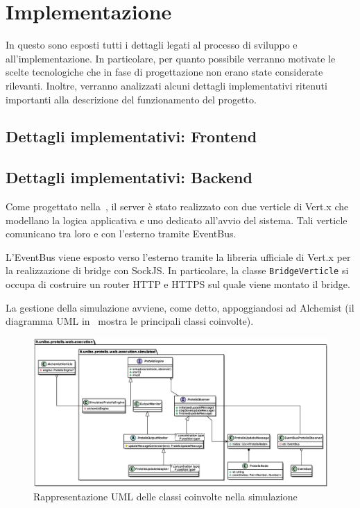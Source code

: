 \chapter{Implementazione}\label{ch:implementation}
  In questo  sono esposti tutti i dettagli legati al processo di sviluppo e all'implementazione.
  In particolare, per quanto possibile verranno motivate le scelte tecnologiche che in fase di progettazione non erano state considerate rilevanti.
  Inoltre, verranno analizzati alcuni dettagli implementativi ritenuti importanti alla descrizione del funzionamento del progetto.

  

  \section{Dettagli implementativi: Frontend}


  \section{Dettagli implementativi: Backend}

    Come progettato nella~, il server è stato realizzato con due verticle di Vert.x che modellano la logica applicativa e uno dedicato all'avvio del sistema.
    Tali verticle comunicano tra loro e con l'esterno tramite EventBus.

    L'EventBus viene esposto verso l'esterno tramite la libreria ufficiale di Vert.x per la realizzazione di bridge con SockJS\@.
    In particolare, la classe \texttt{BridgeVerticle} si occupa di costruire un router HTTP e HTTPS sul quale viene montato il bridge.

    La gestione della simulazione avviene, come detto, appoggiandosi ad Alchemist (il diagramma UML in~ mostra le principali classi coinvolte).

    \begin{figure}[htbp]
      \centering
      \includegraphics[width=\textwidth]{res/uml/engine-simple.eps}
      \caption{Rappresentazione UML delle classi coinvolte nella simulazione}%
      \label{fig:server:uml}
    \end{figure}


